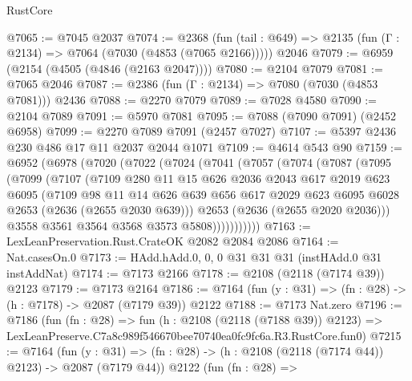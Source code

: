 \begin{lexlean}{RustCore}
\begin{coremodule}
@7065 := @7045 @2037
@7074 := @2368
    (fun (tail : @649) => @2135 (fun (Γ : @2134) => @7064 (@7030 (@4853 (@7065 @2166)))))
    @2046
@7079 := @6959 (@2154 (@4505 (@4846 (@2163 @2047))))
@7080 := @2104 @7079
@7081 := @7065 @2046
@7087 := @2386 (fun (Γ : @2134) => @7080 (@7030 (@4853 @7081))) @2436
@7088 := @2270 @7079
@7089 := @7028 @4580
@7090 := @2104 @7089
@7091 := @5970 @7081
@7095 := @7088 (@7090 @7091) (@2452 @6958)
@7099 := @2270 @7089 @7091 (@2457 @7027)
@7107 := @5397 @2436 @230 @486 @17 @11 @2037 @2044 @1071
@7109 := @4614 @543 @90
@7159 := @6952
    (@6978
      (@7020
        (@7022
          (@7024
            (@7041
              (@7057
                (@7074
                  (@7087
                    (@7095
                      (@7099
                        (@7107
                          (@7109
                            @280
                            @11
                            @15
                            @626
                            @2036
                            @2043
                            @617
                            @2019
                            @623
                            @6095
                            (@7109
                              @98
                              @11
                              @14
                              @626
                              @639
                              @656
                              @617
                              @2029
                              @623
                              @6095
                              @6028
                              @2653
                              (@2636 (@2655 @2030 @639)))
                            @2653
                            (@2636 (@2655 @2020 @2036)))
                          @3558
                          @3561
                          @3564
                          @3568
                          @3573
                          @5808)))))))))))
@7163 := LexLeanPreservation.Rust.CrateOK @2082 @2084 @2086
@7164 := Nat.casesOn.{0}
@7173 := HAdd.hAdd.{0, 0, 0} @31 @31 @31 (instHAdd.{0} @31 instAddNat)
@7174 := @7173 @2166
@7178 := @2108 (@2118 (@7174 @39)) @2123
@7179 := @7173 @2164
@7186 := @7164 (fun (y : @31) => (fn : @28) -> (h : @7178) -> @2087 (@7179 @39)) @2122
@7188 := @7173 Nat.zero
@7196 := @7186
    (fun (fn : @28) =>
    fun (h : @2108 (@2118 (@7188 @39)) @2123) =>
    LexLeanPreserve.C7a8c989f546670bee70740ea0fc9fc6a.R3.RustCore.fun0)
@7215 := @7164
    (fun (y : @31) => (fn : @28) -> (h : @2108 (@2118 (@7174 @44)) @2123) -> @2087 (@7179 @44))
    @2122
    (fun (fn : @28) =>

\end{coremodule}
\end{lexlean}
